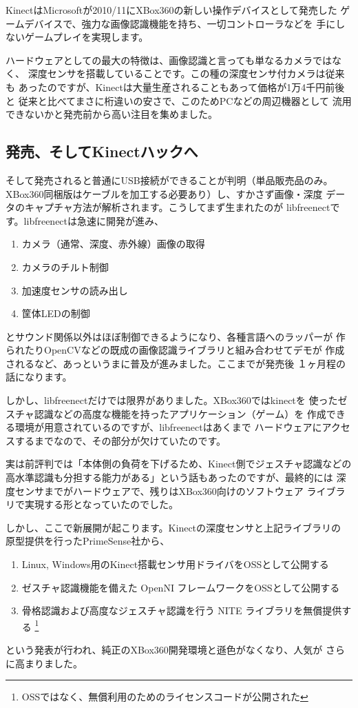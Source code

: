 \documentclass[mingoth,a4paper]{jsarticle}
\begin{document}
KinectはMicrosoftが2010/11にXBox360の新しい操作デバイスとして発売した
ゲームデバイスで、強力な画像認識機能を持ち、一切コントローラなどを
手にしないゲームプレイを実現します。

ハードウェアとしての最大の特徴は、画像認識と言っても単なるカメラではなく、
深度センサを搭載していることです。この種の深度センサ付カメラは従来も
あったのですが、Kinectは大量生産されることもあって価格が1万4千円前後と
従来と比べてまさに桁違いの安さで、このためPCなどの周辺機器として
流用できないかと発売前から高い注目を集めました。

\subsection{発売、そしてKinectハックへ}

そして発売されると普通にUSB接続ができることが判明（単品販売品のみ。
XBox360同梱版はケーブルを加工する必要あり）し、すかさず画像・深度
データのキャプチャ方法が解析されます。こうしてまず生まれたのが
libfreenectです。libfreenectは急速に開発が進み、
\begin{enumerate}
\item カメラ（通常、深度、赤外線）画像の取得
\item カメラのチルト制御
\item 加速度センサの読み出し
\item 筐体LEDの制御
\end{enumerate}
とサウンド関係以外はほぼ制御できるようになり、各種言語へのラッパーが
作られたりOpenCVなどの既成の画像認識ライブラリと組み合わせてデモが
作成されるなど、あっというまに普及が進みました。ここまでが発売後
１ヶ月程の話になります。

しかし、libfreenectだけでは限界がありました。XBox360ではkinectを
使ったゼスチャ認識などの高度な機能を持ったアプリケーション（ゲーム）を
作成できる環境が用意されているのですが、libfreenectはあくまで
ハードウェアにアクセスするまでなので、その部分が欠けていたのです。

実は前評判では「本体側の負荷を下げるため、Kinect側でジェスチャ認識などの
高水準認識も分担する能力がある」という話もあったのですが、最終的には
深度センサまでがハードウェアで、残りはXBox360向けのソフトウェア
ライブラリで実現する形となっていたのでした。

しかし、ここで新展開が起こります。Kinectの深度センサと上記ライブラリの
原型提供を行ったPrimeSense社から、
\begin{enumerate}
\item Linux, Windows用のKinect搭載センサ用ドライバをOSSとして公開する
\item ゼスチャ認識機能を備えた OpenNI フレームワークをOSSとして公開する
\item 骨格認識および高度なジェスチャ認識を行う NITE ライブラリを無償提供する
\footnote{OSSではなく、無償利用のためのライセンスコードが公開された}
\end{enumerate}
という発表が行われ、純正のXBox360開発環境と遜色がなくなり、人気が
さらに高まりました。
\end{document}
